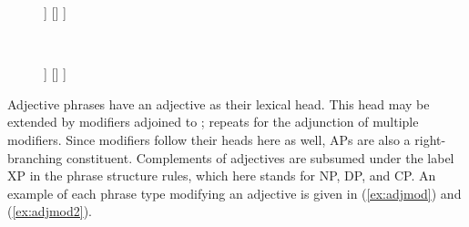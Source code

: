\begin{figure}[h]
\ex{}\label{ex:adjpcstruct}
\begin{minipage}[t]{.5\remaining}
\tl\quad%
\begin{forest}
[{\anno[\elem{\Adjc} $\vee$ \pass{\Plink}]{AP}}
	[\anno{\xbar{A}}
		[\anno{\xhead{A}}]
		[{\anno[\pass{\GF}]{XP}}]
	]
	[{}]
]
\end{forest}
\end{minipage}
~
\begin{minipage}[t]{.5\remaining}
\tl\quad%
\begin{forest}
[{\anno[\elem{\Adjc} $\vee$ \pass{\Plink}]{AP}}
	[\anno{AP}
		[\anno{\xhead{A}}]
		[{\anno[\elem{\Adjc}]{AdvP}}]
	]
	[{}]
]
\end{forest}
\end{minipage}
\xe
\end{figure}

Adjective phrases have an adjective as their lexical head. This head may be
extended by modifiers adjoined to ;  repeats for the adjunction
of multiple modifiers. Since modifiers follow their heads here as well, APs are
also a right-branching constituent. Complements of adjectives are subsumed
under the label XP in the phrase structure rules, which here stands for NP, DP,
and CP. An example of each phrase type modifying an adjective is given in
(\ref{ex:adjmod}) and (\ref{ex:adjmod2}).

